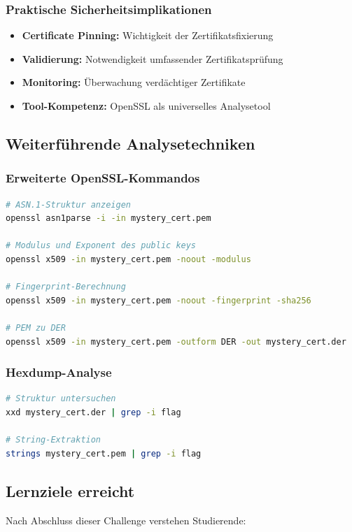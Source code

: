 \documentclass{article}
\begin{document}
\subsubsection{Praktische Sicherheitsimplikationen}
\begin{itemize}
    \item \textbf{Certificate Pinning:} Wichtigkeit der Zertifikatsfixierung
    \item \textbf{Validierung:} Notwendigkeit umfassender Zertifikatsprüfung
    \item \textbf{Monitoring:} Überwachung verdächtiger Zertifikate
    \item \textbf{Tool-Kompetenz:} OpenSSL als universelles Analysetool
\end{itemize}

\subsection{Weiterführende Analysetechniken}

\subsubsection{Erweiterte OpenSSL-Kommandos}
\begin{lstlisting}[language=bash,caption={Erweiterte Zertifikatsanalyse}]
# ASN.1-Struktur anzeigen
openssl asn1parse -i -in mystery_cert.pem

# Modulus und Exponent des public keys
openssl x509 -in mystery_cert.pem -noout -modulus

# Fingerprint-Berechnung
openssl x509 -in mystery_cert.pem -noout -fingerprint -sha256

# PEM zu DER
openssl x509 -in mystery_cert.pem -outform DER -out mystery_cert.der
\end{lstlisting}

\subsubsection{Hexdump-Analyse}
\begin{lstlisting}[language=bash]
# Struktur untersuchen
xxd mystery_cert.der | grep -i flag

# String-Extraktion
strings mystery_cert.pem | grep -i flag
\end{lstlisting}

\subsection{Lernziele erreicht}
Nach Abschluss dieser Challenge verstehen Studierende:
\end{document}
